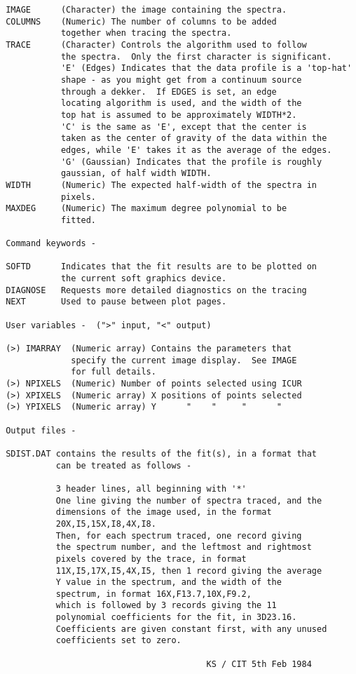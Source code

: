 \begin{description}
\begin{verbatim}
 IMAGE      (Character) the image containing the spectra.
 COLUMNS    (Numeric) The number of columns to be added
            together when tracing the spectra.
 TRACE      (Character) Controls the algorithm used to follow
            the spectra.  Only the first character is significant.
            'E' (Edges) Indicates that the data profile is a 'top-hat'
            shape - as you might get from a continuum source
            through a dekker.  If EDGES is set, an edge
            locating algorithm is used, and the width of the
            top hat is assumed to be approximately WIDTH*2.
            'C' is the same as 'E', except that the center is
            taken as the center of gravity of the data within the
            edges, while 'E' takes it as the average of the edges.
            'G' (Gaussian) Indicates that the profile is roughly
            gaussian, of half width WIDTH.
 WIDTH      (Numeric) The expected half-width of the spectra in
            pixels.
 MAXDEG     (Numeric) The maximum degree polynomial to be
            fitted.

 Command keywords -

 SOFTD      Indicates that the fit results are to be plotted on
            the current soft graphics device.
 DIAGNOSE   Requests more detailed diagnostics on the tracing
 NEXT       Used to pause between plot pages.

 User variables -  (">" input, "<" output)

 (>) IMARRAY  (Numeric array) Contains the parameters that
              specify the current image display.  See IMAGE
              for full details.
 (>) NPIXELS  (Numeric) Number of points selected using ICUR
 (>) XPIXELS  (Numeric array) X positions of points selected
 (>) YPIXELS  (Numeric array) Y      "    "     "      "

 Output files -

 SDIST.DAT contains the results of the fit(s), in a format that
           can be treated as follows -

           3 header lines, all beginning with '*'
           One line giving the number of spectra traced, and the
           dimensions of the image used, in the format
           20X,I5,15X,I8,4X,I8.
           Then, for each spectrum traced, one record giving
           the spectrum number, and the leftmost and rightmost
           pixels covered by the trace, in format
           11X,I5,17X,I5,4X,I5, then 1 record giving the average
           Y value in the spectrum, and the width of the
           spectrum, in format 16X,F13.7,10X,F9.2,
           which is followed by 3 records giving the 11
           polynomial coefficients for the fit, in 3D23.16.
           Coefficients are given constant first, with any unused
           coefficients set to zero.

                                         KS / CIT 5th Feb 1984
\end{verbatim}
\end{description}
